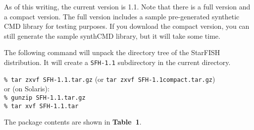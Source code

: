 \documentclass[12pt]{book}
\def\ttg{\tt\color{DarkGreen}}
\begin{document}
\medskip
As of this writing, the current version is 1.1.  Note that there is a 
full version and a compact version.  The full version includes a 
sample pre-generated synthetic CMD library for testing purposes.  If 
you download the compact version, you can still generate the sample 
synthCMD library, but it will take some time.

\medskip 
The following command will unpack the directory tree of the StarFISH 
distribution. It will create a {\ttg SFH-1.1} subdirectory in the 
current directory.

\medskip\noindent
{\ttg \% tar zxvf SFH-1.1.tar.gz} \hfill (or {\ttg tar zxvf SFH-1.1compact.tar.gz}) \\

\noindent or (on Solaris): \\
\medskip
\noindent
{\ttg \% gunzip SFH-1.1.tar.gz} \\
{\ttg \% tar xvf SFH-1.1.tar}

\medskip
The package contents are shown in {\bf Table~1}.
\end{document}
